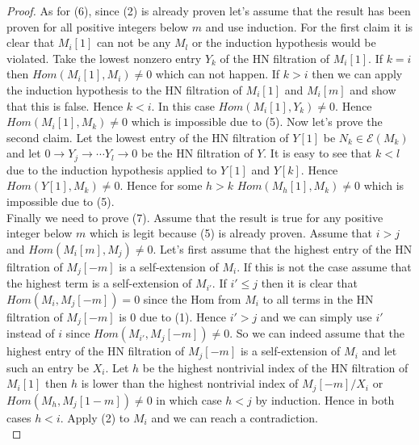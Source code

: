 \begin{proof}
\indent As for (6), since (2) is already proven let's assume that the result has been proven for all positive integers below $m$ and use induction. For the first claim it is clear that $M_i[1]$ can not be any $M_l$ or the induction hypothesis would be violated. Take the lowest nonzero entry $Y_k$ of the HN filtration of $M_i[1]$. If $k=i$ then $Hom(M_i[1],M_i)\neq 0$ which can not happen. If $k>i$ then we can apply the induction hypothesis to the HN filtration of $M_i[1]$ and $M_i[m]$ and show that this is false. Hence $k<i$. In this case $Hom(M_i[1],Y_k)\neq 0$. Hence $Hom(M_i[1],M_k)\neq 0$ which is impossible due to (5). Now let's prove the second claim. Let the lowest entry of the HN filtration of $Y[1]$ be $N_k\in\mathcal{E}(M_k)$ and let $0\to Y_j\to\cdots Y_l\to 0$ be the HN filtration of $Y$. It is easy to see that $k<l$ due to the induction hypothesis applied to $Y[1]$ and $Y[k]$. Hence $Hom(Y[1],M_k)\neq 0$. Hence for some $h>k$ $Hom(M_h[1],M_k)\neq 0$ which is impossible due to (5).\\
\indent Finally we need to prove (7). Assume that the result is true for any positive integer below $m$ which is legit because (5) is already proven. Assume that $i>j$ and $Hom(M_i[m],M_j) \neq 0$. Let's first assume that the highest entry of the HN filtration of $M_j[-m]$ is a self-extension of $M_i$. If this is not the case assume that the highest term is a self-extension of $M_{i'}$. If $i'\leq j$ then it is clear that $Hom(M_i,M_j[-m])=0$ since the Hom from $M_i$ to all terms in the HN filtration of $M_j[-m]$ is 0 due to (1). Hence $i'>j$ and we can simply use $i'$ instead of $i$ since $Hom(M_{i'},M_j[-m])\neq 0$. So we can indeed assume that the highest entry of the HN filtration of $M_j[-m]$ is a self-extension of $M_i$ and let such an entry be $X_i$. Let $h$ be the highest nontrivial index of the HN filtration of $M_i[1]$ then $h$ is lower than the highest nontrivial index of $M_j[-m]/X_i$ or $Hom(M_h,M_j[1-m])\neq 0$ in which case $h<j$ by induction. Hence in both cases $h<i$. Apply (2) to $M_i$ and we can reach a contradiction.\\
\end{proof}
